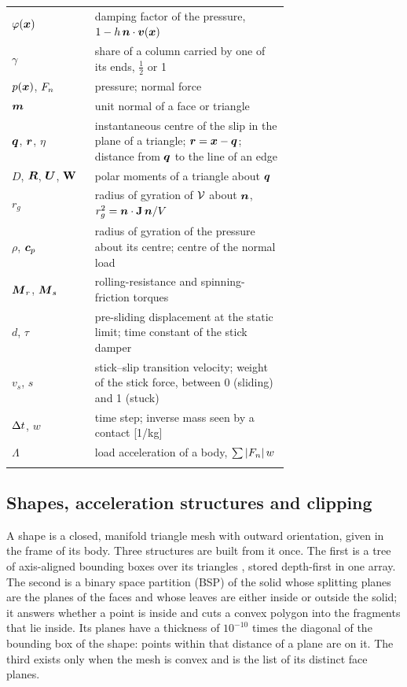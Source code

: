 \begin{table}[!htbp]
\begin{tabular}{@{}lp{0.70\linewidth}@{}}
$\varphi(\boldsymbol{x})$ & damping factor of the pressure, $1 - h\,\boldsymbol{n}\cdot\boldsymbol{v}(\boldsymbol{x})$ \\
$\gamma$ & share of a column carried by one of its ends, $\tfrac12$ or 1 \\
$p(\boldsymbol{x})$, $F_n$ & pressure; normal force \\
$\boldsymbol{m}$ & unit normal of a face or triangle \\
$\boldsymbol{q}$, $\boldsymbol{r}$, $\eta$ & instantaneous centre of the slip in the plane of a triangle; $\boldsymbol{r} = \boldsymbol{x} - \boldsymbol{q}$; distance from $\boldsymbol{q}$ to the line of an edge \\
$D$, $\boldsymbol{R}$, $\boldsymbol{U}$, $\mathbf{W}$ & polar moments of a triangle about $\boldsymbol{q}$ \\
$r_g$ & radius of gyration of $\mathcal{V}$ about $\boldsymbol{n}$, $r_g^2 = \boldsymbol{n}\cdot\mathbf{J}\,\boldsymbol{n} / V$ \\
$\rho$, $\boldsymbol{c}_p$ & radius of gyration of the pressure about its centre; centre of the normal load \\
$\boldsymbol{M}_r$, $\boldsymbol{M}_s$ & rolling-resistance and spinning-friction torques \\
$d$, $\tau$ & pre-sliding displacement at the static limit; time constant of the stick damper \\
$v_s$, $s$ & stick--slip transition velocity; weight of the stick force, between 0 (sliding) and 1 (stuck) \\
$\Delta t$, $w$ & time step; inverse mass seen by a contact [1/kg] \\
$\Lambda$ & load acceleration of a body, $\sum|F_n|\,w$ \\
\botrule
\end{tabular}
\end{table}

\subsection{Shapes, acceleration structures and clipping}

A shape is a closed, manifold triangle mesh with outward orientation, given in the frame of its
body. Three structures are built from it once. The first is a tree of axis-aligned bounding
boxes over its triangles \cite{vandenBergen1997}, stored depth-first in one array. The second
is a binary space partition (BSP) of the solid \cite{Thibault1987} whose splitting planes are
the planes of the faces and whose leaves are either inside or outside the solid; it answers
whether a point is inside and cuts a convex polygon into the fragments that lie inside. Its
planes have a thickness of $10^{-10}$ times the diagonal of the bounding box of the shape:
points within that distance of a plane are on it. The third exists only when the mesh is convex
and is the list of its distinct face planes.

